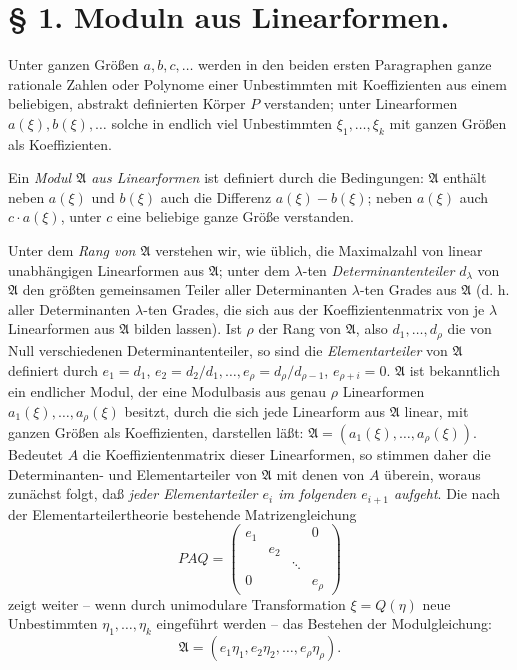 \documentclass[11pt]{article}
\newcommand{\Amod}{\mathfrak A}
\begin{document}
\section*{§ 1. Moduln aus Linearformen.}

Unter ganzen Größen $a,b,c,\ldots$ werden in den beiden ersten Paragraphen ganze rationale Zahlen oder Polynome einer Unbestimmten mit Koeffizienten aus einem beliebigen, abstrakt definierten Körper $P$ verstanden; unter Linearformen $a(\xi),b(\xi),\ldots$ solche in endlich viel Unbestimmten $\xi_1,\ldots,\xi_k$ mit ganzen Größen als Koeffizienten.

Ein \emph{Modul $\Amod$ aus Linearformen} ist definiert durch die Bedingungen: $\Amod$ enthält neben $a(\xi)$ und $b(\xi)$ auch die Differenz $a(\xi)-b(\xi)$; neben $a(\xi)$ auch $c\cdot a(\xi)$, unter $c$ eine beliebige ganze Größe verstanden.

Unter dem \emph{Rang von $\Amod$} verstehen wir, wie üblich, die Maximalzahl von linear unabhängigen Linearformen aus $\Amod$; unter dem $\lambda$-ten \emph{Determinantenteiler} $d_\lambda$ von $\Amod$ den größten gemeinsamen Teiler aller Determinanten $\lambda$-ten Grades aus $\Amod$ (d. h. aller Determinanten $\lambda$-ten Grades, die sich aus der Koeffizientenmatrix von je $\lambda$ Linearformen aus $\Amod$ bilden lassen). Ist $\rho$ der Rang von $\Amod$, also $d_1,\ldots,d_\rho$ die von Null verschiedenen Determinantenteiler, so sind die \emph{Elementarteiler} von $\Amod$ definiert durch $e_1=d_1$, $e_2=d_2/d_1,\ldots,e_\rho=d_\rho/d_{\rho-1}$, $e_{\rho+i}=0$. $\Amod$ ist bekanntlich ein endlicher Modul, der eine Modulbasis aus genau $\rho$ Linearformen $a_1(\xi),\ldots,a_\rho(\xi)$ besitzt, durch die sich jede Linearform aus $\Amod$ linear, mit ganzen Größen als Koeffizienten, darstellen läßt: $\Amod=(a_1(\xi),\ldots,a_\rho(\xi))$. Bedeutet $A$ die Koeffizientenmatrix dieser Linearformen, so stimmen daher die Determinanten- und Elementarteiler von $\Amod$ mit denen von $A$ überein, woraus zunächst folgt, daß \emph{jeder Elementarteiler $e_i$ im folgenden $e_{i+1}$ aufgeht}. Die nach der Elementarteilertheorie bestehende Matrizengleichung
\[
 P A Q=\begin{pmatrix}
 e_1&&&0\\
 &e_2&&\\
 &&\ddots&\\
 0&&&e_\rho
 \end{pmatrix}
\]
zeigt weiter -- wenn durch unimodulare Transformation $\xi=Q(\eta)$ neue Unbestimmten $\eta_1,\ldots,\eta_k$ eingeführt werden -- das Bestehen der Modulgleichung:
\begin{equation}
 \Amod=(e_1\eta_1,e_2\eta_2,\ldots,e_\rho\eta_\rho).
\tag{1}
\end{equation}
\end{document}

